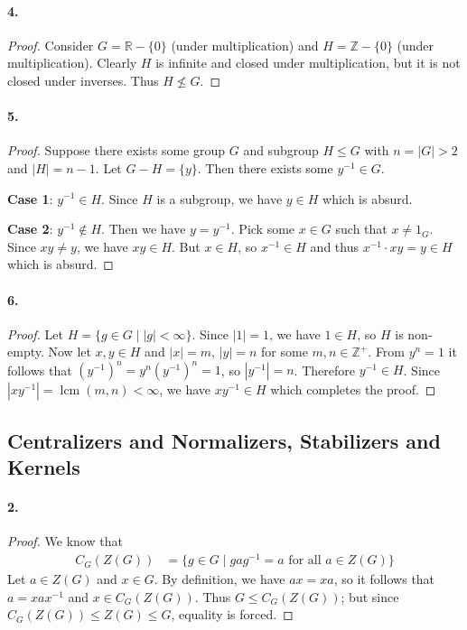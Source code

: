 \documentclass{article}
\DeclareMathOperator{\lcm}{lcm}
\begin{document}
\paragraph{4.}
\begin{proof}
  Consider $G = \mathbb{R} - \{0\}$ (under multiplication) and $H = \mathbb{Z} -
  \{0\}$ (under multiplication). Clearly $H$ is infinite and closed under
  multiplication, but it is not closed under inverses. Thus $H \nleq G$.
\end{proof}

\paragraph{5.}
\begin{proof}
  Suppose there exists some group $G$ and subgroup $H \leq G$ with $n = |G| > 2$
  and $|H| = n - 1$. Let $G - H = \{y\}$. Then there exists some $y^{-1} \in G$.

  \textbf{Case 1}: $y^{-1} \in H$. Since $H$ is a subgroup, we have $y \in H$
  which is absurd.

  \textbf{Case 2}: $y^{-1} \not\in H$. Then we have $y = y^{-1}$. Pick some
  $x \in G$ such that $x \neq 1_G$. Since $xy \neq y$, we have $xy \in H$.
  But $x \in H$, so $x^{-1} \in H$ and thus $x^{-1} \cdot xy = y \in H$ which is
  absurd.
\end{proof}

\paragraph{6.}
\begin{proof}
  Let $H = \{g \in G \mid |g| < \infty\}$. Since $|1| = 1$, we have $1 \in H$,
  so $H$ is non-empty. Now let $x, y \in H$ and $|x| = m$, $|y| = n$ for some
  $m, n \in \mathbb{Z}^+$. From $y^n = 1$ it follows that $(y^{-1})^n =
  y^n(y^{-1})^n = 1$, so $|y^{-1}| = n$. Therefore $y^{-1} \in H$. Since
  $|xy^{-1}| = \lcm(m, n) < \infty$, we have $xy^{-1} \in H$ which completes the
  proof.
\end{proof}

\subsection{Centralizers and Normalizers, Stabilizers and Kernels}

\paragraph{2.}
\begin{proof}
  We know that \begin{align*}
    C_G(Z(G))
    &= \{g \in G \mid gag^{-1} = a \text{ for all } a \in Z(G)\}
  \end{align*} Let $a \in Z(G)$ and $x \in G$. By definition, we have $ax = xa$,
  so it follows that $a = xax^{-1}$ and $x \in C_G(Z(G))$. Thus $G \leq
  C_G(Z(G))$; but since $C_G(Z(G)) \leq Z(G) \leq G$, equality is forced.
\end{proof}
\end{document}
